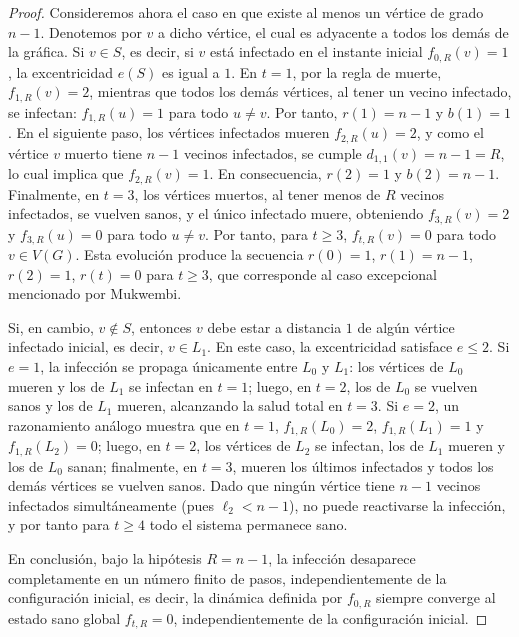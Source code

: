 \documentclass[12pt,titlepage,twoside,openright]{book}
\begin{document}
\begin{proof}
    Consideremos ahora el caso en que existe al menos un v\'ertice de grado $n-1$. Denotemos por $v$ a dicho v\'ertice, el cual es adyacente a todos los dem\'as de la gr\'afica. Si $v \in S$, es decir, si $v$ est\'a infectado en el instante inicial $f_{0,R}(v) = 1$, la excentricidad $e(S)$ es igual a $1$. En $t=1$, por la regla de muerte, $f_{1,R}(v) = 2$, mientras que todos los dem\'as v\'ertices, al tener un vecino infectado, se infectan: $f_{1,R}(u) = 1$ para todo $u \neq v$. Por tanto, $r(1) = n-1$ y $b(1)=1$. En el siguiente paso, los v\'ertices infectados mueren $f_{2,R}(u)=2$, y como el v\'ertice $v$ muerto tiene $n-1$ vecinos infectados, se cumple $d_{1,1}(v)=n-1=R$, lo cual implica que $f_{2,R}(v)=1$. En consecuencia, $r(2)=1$ y $b(2)=n-1$. Finalmente, en $t=3$, los v\'ertices muertos, al tener menos de $R$ vecinos infectados, se vuelven sanos, y el \'unico infectado muere, obteniendo $f_{3,R}(v)=2$ y $f_{3,R}(u)=0$ para todo $u\neq v$. Por tanto, para $t \ge 3$, $f_{t,R}(v)=0$ para todo $v \in V(G)$. Esta evoluci\'on produce la secuencia $r(0)=1$, $r(1)=n-1$, $r(2)=1$, $r(t)=0$ para $t \ge 3$, que corresponde al caso excepcional mencionado por Mukwembi.

    Si, en cambio, $v \notin S$, entonces $v$ debe estar a distancia $1$ de alg\'un v\'ertice infectado inicial, es decir, $v \in L_1$. En este caso, la excentricidad satisface $e \le 2$. Si $e=1$, la infecci\'on se propaga \'unicamente entre $L_0$ y $L_1$: los v\'ertices de $L_0$ mueren y los de $L_1$ se infectan en $t=1$; luego, en $t=2$, los de $L_0$ se vuelven sanos y los de $L_1$ mueren, alcanzando la salud total en $t=3$. Si $e=2$, un razonamiento an\'alogo muestra que en $t=1$, $f_{1,R}(L_0)=2$, $f_{1,R}(L_1)=1$ y $f_{1,R}(L_2)=0$; luego, en $t=2$, los v\'ertices de $L_2$ se infectan, los de $L_1$ mueren y los de $L_0$ sanan; finalmente, en $t=3$, mueren los \'ultimos infectados y todos los dem\'as v\'ertices se vuelven sanos. Dado que ning\'un v\'ertice tiene $n-1$ vecinos infectados simult\'aneamente (pues $\ell_2 < n-1$), no puede reactivarse la infecci\'on, y por tanto para $t \ge 4$ todo el sistema permanece sano.

    En conclusi\'on, bajo la hip\'otesis $R = n - 1$, la infecci\'on desaparece completamente en un n\'umero finito de pasos, independientemente de la configuraci\'on inicial, es decir, la din\'amica definida por $f_{0,R}$ siempre converge al estado sano global $f_{t,R} = 0$, independientemente de la configuraci\'on inicial.
\end{proof}
\end{document}
